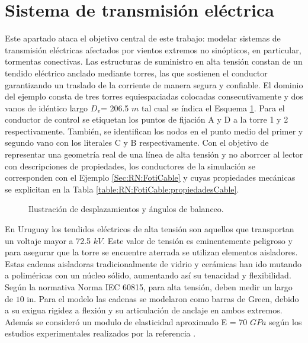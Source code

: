 \section{Sistema de transmisión eléctrica }\label{ejemplo:transmissionSystem}
Este apartado ataca el objetivo central de este trabajo: modelar sistemas de transmisión eléctricas afectados por vientos extremos no sinópticos, en particular, tormentas conectivas. Las estructuras de suministro en alta tensión constan de un tendido eléctrico anclado mediante torres, las que sostienen el conductor garantizando un traslado de la corriente de manera segura y confiable. El dominio del ejemplo consta de tres torres equiespaciadas colocadas consecutivamente y dos vanos de idéntico largo $D_v$= 206.5 $m$ tal cual se índica el Esquema \ref{fig:Transmission:EsquemaGeneral}.  Para el conductor de control se etiquetan los puntos de fijación $\text{A}$ y $\text{D}$ a la torre 1 y 2 respectivamente. También, se identifican los nodos en el punto medio del primer y segundo vano con los literales $\text{C}$ y $\text{B}$ respectivamente. Con el objetivo de representar una geometría real de una línea de alta tensión y no aborrcer al lector con descripciones de propiedades, los conductores de la simulación se corresponden con el Ejemplo \ref{Sec:RN:FotiCable} y cuyas propiedades mecánicas se explicitan en la Tabla \ref{table:RN:FotiCable:propiedadesCable}.  


\begin{figure}[htbp]
	\centering
	\def\svgwidth{120mm}
	
	\caption{Ilustración de desplazamientos y ángulos de balanceo.}
	\label{fig:Transmission:EsquemaGeneral}
\end{figure}

 En Uruguay los tendidos eléctricos de alta tensión son aquellos que transportan un voltaje mayor a 72.5 $kV$. Este valor de tensión es eminentemente peligroso y para asegurar que la torre se encuentre aterrada se utilizan elementos aisladores. Estas cadenas aisladoras tradicionalmente de vidrio y cerámicas han ido mutando a poliméricas con un núcleo sólido, aumentando así su tenacidad y flexibilidad. Según la normativa Norma IEC 60815, para alta tensión, deben medir un largo de $10$ in. Para el modelo las cadenas se modelaron como barras de Green, debido a su exigua rigidez a flexión y su articulación de anclaje en ambos extremos. Además se consideró un modulo de elasticidad aproximado E = 70 $GPa$ según los estudios experimentales realizados por la referencia \cite{TesisMexicano}.



